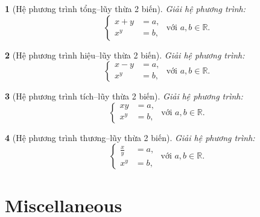 \documentclass{article}
\newtheorem{baitoan}{}
\begin{document}
\begin{baitoan}[Hệ phương trình tổng--lũy thừa 2 biến]
	Giải hệ phương trình:
	\begin{equation}
		\left\{\begin{split}
			x + y &= a,\\
			x^y &= b,
		\end{split}\right.\mbox{ với }	a,b\in\mathbb{R}.
	\end{equation}
\end{baitoan}

\begin{baitoan}[Hệ phương trình hiệu--lũy thừa 2 biến]
	Giải hệ phương trình:
	\begin{equation}
		\left\{\begin{split}
			x - y &= a,\\
			x^y &= b,
		\end{split}\right.\mbox{ với }	a,b\in\mathbb{R}.
	\end{equation}
\end{baitoan}

\begin{baitoan}[Hệ phương trình tích--lũy thừa 2 biến]
	Giải hệ phương trình:
	\begin{equation}
		\left\{\begin{split}
			xy &= a,\\
			x^y &= b,
		\end{split}\right.\mbox{ với }	a,b\in\mathbb{R}.
	\end{equation}
\end{baitoan}

\begin{baitoan}[Hệ phương trình thương--lũy thừa 2 biến]
	Giải hệ phương trình:
	\begin{equation}
		\left\{\begin{split}
			\frac{x}{y} &= a,\\
			x^y &= b,
		\end{split}\right.\mbox{ với }	a,b\in\mathbb{R}.
	\end{equation}
\end{baitoan}



\section{Miscellaneous}


\printbibliography[heading=bibintoc]
	
\end{document}

